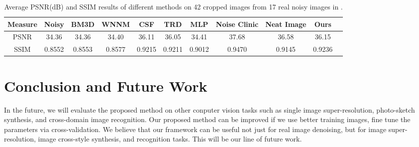 \documentclass[10pt,twocolumn,letterpaper]{article}
\begin{document}
\begin{table}
\caption{Average PSNR(dB) and SSIM results of different methods on 42 cropped images from 17 real noisy images in \cite{crosschannel2016}.}
\label{tab1}
\begin{center}
\renewcommand\arraystretch{1}
\begin{tabular}{|c||c|c|c|c|c|c|c|c|c|c|}
\hline
Measure & \textbf{Noisy} &\textbf{BM3D}&\textbf{WNNM}&\textbf{CSF}&\textbf{TRD}&\textbf{MLP}& \textbf{Noise Clinic}& \textbf{Neat Image}&\textbf{Ours}
\\
\hline
PSNR& 34.36 & 34.36 & 34.40 & 36.11 & 36.05 & 34.41 & 37.68 & 36.58 & 36.15
\\
\hline
SSIM& 0.8552 & 0.8553 & 0.8577 & 0.9215 & 0.9211 & 0.9012 & 0.9470 & 0.9145 & 0.9236
\\
\hline
\end{tabular}
\end{center}
\end{table}


\section{Conclusion and Future Work}

In the future, we will evaluate the proposed method on other conputer vision tasks such as single image super-resolution, photo-sketch synthesis, and cross-domain image recognition. Our proposed method can be improved if we use better training images, fine tune the parameters via cross-validation. We believe that our framework can be useful not just for real image denoising, but for image super-resolution, image cross-style synthesis, and recognition tasks. This will be our line of future work.

{\small


}
\end{document}
